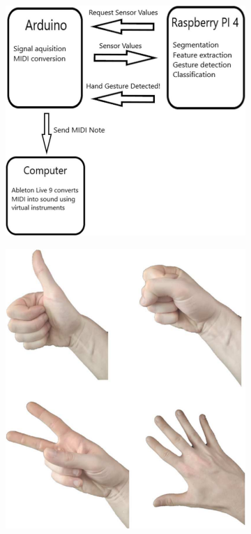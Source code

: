 \begin{figure}[ht]
	\centering
	\begin{subfigure}{0.32\textwidth}
		\centering
		\includegraphics[width=\textwidth]{images/related-work/emg-architecture}
	\end{subfigure}
	\hfill
	\begin{subfigure}{0.32\textwidth}
		\centering
		\includegraphics[width=\textwidth]{images/related-work/emg-gestures}

\end{subfigure}
\end{figure}
